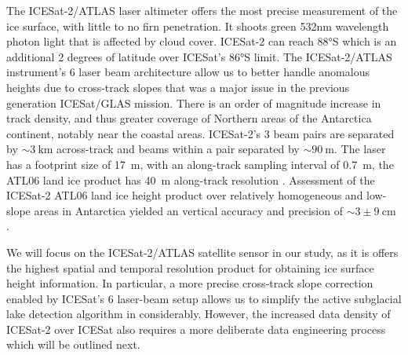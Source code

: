 The ICESat-2/ATLAS \citep[2018- ;][]{MarkusIceCloudland2017} laser altimeter offers the most precise measurement of the ice surface, with little to no firn penetration.
It shoots green 532nm wavelength photon light that is affected by cloud cover.
ICESat-2 can reach 88°S which is an additional 2 degrees of latitude over ICESat's 86°S limit.
The ICESat-2/ATLAS instrument's 6 laser beam architecture allow us to better handle anomalous heights due to cross-track slopes that was a major issue in the previous generation ICESat/GLAS mission.
There is an order of magnitude increase in track density, and thus greater coverage of Northern areas of the Antarctica continent, notably near the coastal areas.
ICESat-2's 3 beam pairs are separated by $\sim\SI{3}{\kilo\metre}$ across-track and beams within a pair separated by $\sim\SI{90}{\metre}$.
The laser has a footprint size of \SI{17}{\metre}, with an along-track sampling interval of \SI{0.7}{\metre}, the ATL06 land ice product has \SI{40}{\metre} along-track resolution \citep{SmithLandiceheightretrieval2019}.
Assessment of the ICESat-2 ATL06 land ice height product over relatively homogeneous and low-slope areas in Antarctica yielded an vertical accuracy and precision of $\sim3\pm\SI{9}{\centi\metre}$ \citep{BruntAssessmentICESatIce2019}.

We will focus on the ICESat-2/ATLAS satellite sensor in our study, as it is offers the highest spatial and temporal resolution product for obtaining ice surface height information.
In particular, a more precise cross-track slope correction enabled by ICESat's 6 laser-beam setup allows us to simplify the active subglacial lake detection algorithm in \citet{Smithinventoryactivesubglacial2009} considerably.
However, the increased data density of ICESat-2 over ICESat also requires a more deliberate data engineering process which will be outlined next.




